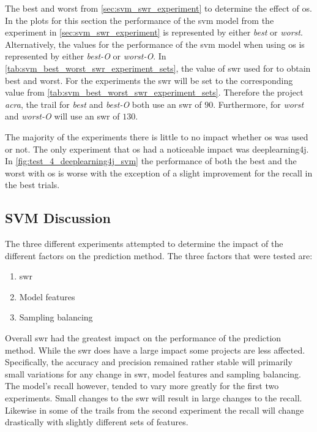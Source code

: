 The best and worst from \autoref{sec:svm_swr_experiment} to determine the effect of \gls{os}. In the plots for this section the performance of the \gls{svm} model from the experiment in \autoref{sec:svm_swr_experiment} is represented by either \textit{best} or \textit{worst}. Alternatively, the values for the performance of the \gls{svm} model when using \gls{os} is represented by either \textit{best-O} or \textit{worst-O}. In \autoref{tab:svm_best_worst_swr_experiment_sets}, the value of \gls{swr} used for to obtain best and worst. For the experiments the \gls{swr} will be set to the corresponding value from \autoref{tab:svm_best_worst_swr_experiment_sets}. Therefore the project \textit{acra}, the trail for \textit{best} and \textit{best-O} both use an \gls{swr} of $90$. Furthermore, for \textit{worst} and \textit{worst-O} will use an \gls{swr} of $130$.

The majority of the experiments there is little to no impact whether \gls{os} was used or not. The only experiment that \gls{os} had a noticeable impact was deeplearning4j. In \autoref{fig:test_4_deeplearning4j_svm} the performance of both the best and the worst with \gls{os} is worse with the exception of a slight improvement for the recall in the best trials.

\subsection{SVM Discussion}
\label{subsec:svm_discussion}

The three different experiments attempted to determine the impact of the different factors on the prediction method. The three factors that were tested are:
\begin{enumerate}
\item \gls{swr}
\item Model features
\item Sampling balancing
\end{enumerate}
Overall \gls{swr} had the greatest impact on the performance of the prediction method. While the \gls{swr} does have a large impact some projects are less affected. Specifically, the accuracy and precision remained rather stable will primarily small variations for any change in \gls{swr}, model features and sampling balancing. The model's recall however, tended to vary more greatly for the first two experiments. Small changes to the \gls{swr} will result in large changes to the recall. Likewise in some of the trails from the second experiment the recall will change drastically with slightly different sets of features.

